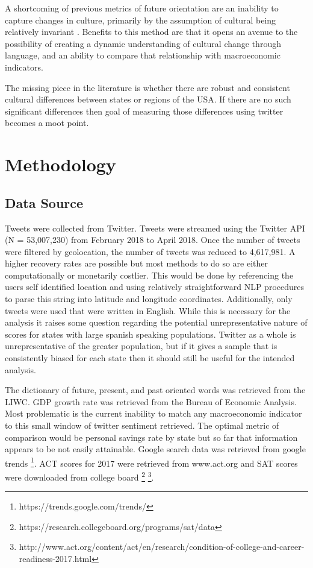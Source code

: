 \documentclass{article}
\begin{document}
A shortcoming of previous metrics of future orientation are an inability to capture changes in culture, primarily by the assumption of cultural being relatively invariant \citep{tang2008framework}. Benefits to this method are that it opens an avenue to the possibility of creating a dynamic understanding of cultural change through language, and an ability to compare that relationship with macroeconomic indicators.

The missing piece in the literature is whether there are robust and consistent cultural differences between states or regions of the USA. If there are no such significant differences then goal of measuring those differences using twitter becomes a moot point. 

\section{Methodology}

\subsection{Data Source}
Tweets were collected from Twitter. 
Tweets were streamed using the Twitter API (N = 53,007,230) from February 2018 to April 2018. Once the number of tweets were filtered by geolocation, the number of tweets was reduced to 4,617,981. A higher recovery rates are possible but most methods to do so are either computationally or monetarily costlier. This would be done by referencing the users self identified location and using relatively straightforward NLP procedures to parse this string into latitude and longitude coordinates. Additionally, only tweets were used that were written in English. While this is necessary for the analysis it raises some question regarding the potential unrepresentative nature of scores for states with large spanish speaking populations. Twitter as a whole is unrepresentative of the greater population, but if it gives a sample that is consistently biased for each state then it should still be useful for the intended analysis.  

The dictionary of future, present, and past oriented words was retrieved from the LIWC. 
GDP growth rate was retrieved from the Bureau of Economic Analysis. Most problematic is the current inability to match any macroeconomic indicator to this small window of twitter sentiment retrieved. The optimal metric of comparison would be personal savings rate by state but so far that information appears to be not easily attainable. Google search data was retrieved from google trends \footnote{https://trends.google.com/trends/}. ACT scores for 2017 were retrieved from www.act.org and SAT scores were downloaded from college board \footnote{https://research.collegeboard.org/programs/sat/data}  \footnote{http://www.act.org/content/act/en/research/condition-of-college-and-career-readiness-2017.html}.
\end{document}
